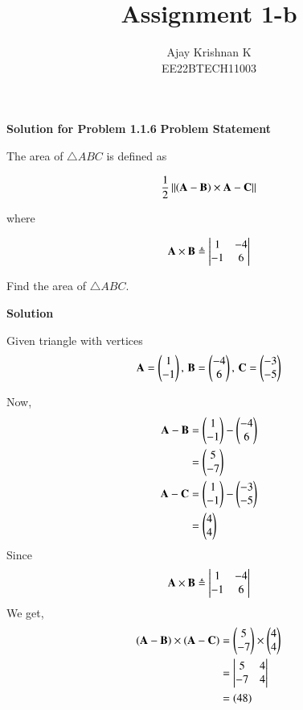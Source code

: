 \documentclass[journal,11pt]{IEEEtran}
\begin{document}
\vspace{3cm}
\author{Ajay Krishnan K\\EE22BTECH11003}

\title{Assignment 1-b}
\maketitle

\textbf{Solution for Problem 1.1.6}
\bigbreak
\textbf{Problem Statement}

The area of $\triangle ABC$ is defined as

\begin{align}
    \frac{1}{2}\left\lVert{\ensuremath{\left(\mathbf{A}-\mathbf{B}\right)}\times {\mathbf{A}-\mathbf{C}}}\right\rVert
\end{align}

where

\begin{align}
    \mathbf{A}\times\mathbf{B} \triangleq \begin{vmatrix}1 & -4 \\-1 & 6\end{vmatrix}
\end{align}

Find the area of $\triangle ABC$.

\textbf{Solution}

Given triangle with vertices
\begin{align}
    \label{eq:tri-pts}
    \mathbf{A} = \begin{pmatrix} 1 \\ -1 \end{pmatrix},\,
    \mathbf{B} = \begin{pmatrix}-4 \\ 6\end{pmatrix},\,
    \mathbf{C} = \begin{pmatrix}-3 \\ -5\end{pmatrix}
\end{align}

Now,
\begin{align}
    \mathbf{A} - \mathbf{B} & = \begin{pmatrix} 1 \\ -1 \end{pmatrix} - \begin{pmatrix}-4 \\ 6\end{pmatrix}\\
                      & = \begin{pmatrix}5  \\ -7\end{pmatrix}\\
    \mathbf{A} - \mathbf{C} & = \begin{pmatrix} 1 \\ -1 \end{pmatrix} - \begin{pmatrix}-3 \\ -5\end{pmatrix}\\
                      & = \begin{pmatrix}4  \\ 4\end{pmatrix}
\end{align}
Since
\begin{align}
    \mathbf{A}\times\mathbf{B} \triangleq \begin{vmatrix}1 & -4 \\-1 & 6\end{vmatrix}
\end{align}
We get,
\begin{align}
    (\mathbf{A} - \mathbf{B})\times(\mathbf{A} - \mathbf{C}) & = \begin{pmatrix}5     \\ -7\end{pmatrix} \times \begin{pmatrix}4  \\ 4\end{pmatrix}\\
                                                 & = \begin{vmatrix}5 & 4 \\-7 & 4\end{vmatrix}\\
                                                 & = ( 48 )
\end{align}
\end{document}
